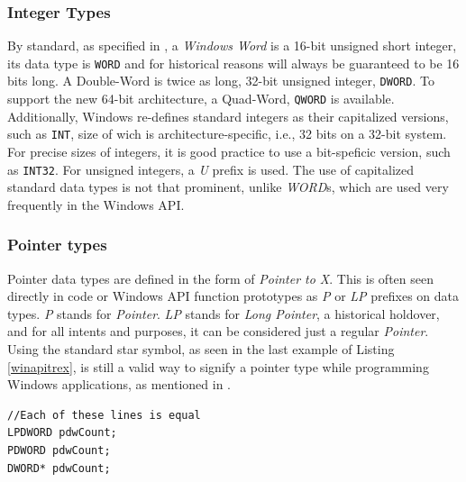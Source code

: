 \subsubsection{Integer Types}
\label{winIntegers}
By standard, as specified in \cite{WinConventions}, a \textit{Windows Word} is a 16-bit unsigned short integer, its data type is \lstinline{WORD} and for historical reasons will always be guaranteed to be 16 bits long. A Double-Word is twice as long, 32-bit unsigned integer, \lstinline{DWORD}. To support the new 64-bit architecture, a Quad-Word, \lstinline{QWORD} is available. Additionally, Windows re-defines standard integers as their capitalized versions, such as \lstinline{INT}, size of wich is architecture-specific, i.e., 32 bits on a 32-bit system. For precise sizes of integers, it is good practice to use a bit-speficic version, such as \lstinline{INT32}. For unsigned integers, a \textit{U} prefix is used. The use of capitalized standard data types is not that prominent, unlike \textit{WORD}s, which are used very frequently in the Windows API.

\subsubsection{Pointer types}
Pointer data types are defined in the form of \textit{Pointer to X}. This is often seen directly in code or Windows API function prototypes as \textit{P} or \textit{LP} prefixes on data types. \textit{P} stands for \textit{Pointer}. \textit{LP} stands for \textit{Long Pointer}, a historical holdover, and for all intents and purposes, it can be considered just a regular \textit{Pointer}. Using the standard star symbol, as seen in the last example of Listing \ref{winapitrex}, is still a valid way to signify a pointer type while programming Windows applications, as mentioned in \cite{WinConventions}.
\begin{lstlisting}[caption={An example of declaring a pointer to a double-word}, label=winapitrex]
//Each of these lines is equal
LPDWORD pdwCount;
PDWORD pdwCount;
DWORD* pdwCount;
\end{lstlisting}

